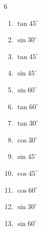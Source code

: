 \begin{multicols}{6}
\begin{enumerate}
  \item $\displaystyle \tan{45^\circ}$

        \phantom{$\displaystyle =1$}

  \item $\displaystyle \sin{30^\circ}$


  \item $\displaystyle \tan{45^\circ}$

        \phantom{$\displaystyle =1$}

  \item $\displaystyle \sin{45^\circ}$


  \item $\displaystyle \sin{60^\circ}$


  \item $\displaystyle \tan{60^\circ}$


  \item $\displaystyle \tan{30^\circ}$


  \item $\displaystyle \cos{30^\circ}$


  \item $\displaystyle \sin{45^\circ}$


  \item $\displaystyle \cos{45^\circ}$


  \item $\displaystyle \cos{60^\circ}$


\columnbreak %

  \item $\displaystyle \sin{30^\circ}$


  \item $\displaystyle \sin{60^\circ}$


\end{enumerate}
\end{multicols}
